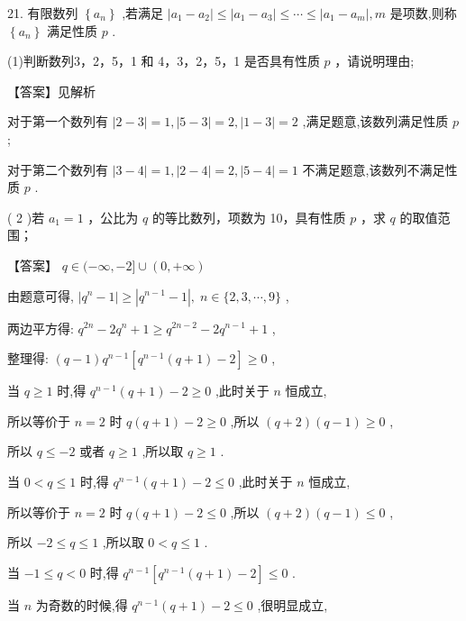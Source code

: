 \documentclass[10pt]{article}
\begin{document}
21. 有限数列 \(\left\{  {a}_{n}\right\}\) ,若满足 \(\left| {{a}_{1} - {a}_{2}}\right|  \leq  \left| {{a}_{1} - {a}_{3}}\right|  \leq  \cdots  \leq  \left| {{a}_{1} - {a}_{m}}\right| ,m\) 是项数,则称 \(\left\{  {a}_{n}\right\}\) 满足性质 \(p\) .

(1)判断数列3，2，5，1 和 4，3，2，5，1 是否具有性质 \(p\) ，请说明理由;

【答案】见解析

对于第一个数列有 \(\left| {2 - 3}\right|  = 1,\left| {5 - 3}\right|  = 2,\left| {1 - 3}\right|  = 2\) ,满足题意,该数列满足性质 \(p\) ;

对于第二个数列有 \(\left| {3 - 4}\right|  = 1,\left| {2 - 4}\right|  = 2,\left| {5 - 4}\right|  = 1\) 不满足题意,该数列不满足性质 \(p\) .

( 2 )若 \({a}_{1} = 1\) ，公比为 \(q\) 的等比数列，项数为 10，具有性质 \(p\) ，求 \(q\) 的取值范围；

【答案】 \(q \in  ( - \infty , - 2\rbrack  \cup  \left( {0, + \infty }\right)\)

由题意可得, \(\left| {{q}^{n} - 1}\right|  \geq  \left| {{q}^{n - 1} - 1}\right| ,\;n \in  \{ 2,3,\cdots ,9\}\) ,

两边平方得: \({q}^{2n} - 2{q}^{n} + 1 \geq  {q}^{{2n} - 2} - 2{q}^{n - 1} + 1\) ,

整理得: \(\left( {q - 1}\right) {q}^{n - 1}\left\lbrack  {{q}^{n - 1}\left( {q + 1}\right)  - 2}\right\rbrack   \geq  0\) ,

当 \(q \geq  1\) 时,得 \({q}^{n - 1}\left( {q + 1}\right)  - 2 \geq  0\) ,此时关于 \(n\) 恒成立,

所以等价于 \(n = 2\) 时 \(q\left( {q + 1}\right)  - 2 \geq  0\) ,所以 \(\left( {q + 2}\right) \left( {q - 1}\right)  \geq  0\) ,

所以 \(q \leq   - 2\) 或者 \(q \geq  1\) ,所以取 \(q \geq  1\) .

当 \(0 < q \leq  1\) 时,得 \({q}^{n - 1}\left( {q + 1}\right)  - 2 \leq  0\) ,此时关于 \(n\) 恒成立,

所以等价于 \(n = 2\) 时 \(q\left( {q + 1}\right)  - 2 \leq  0\) ,所以 \(\left( {q + 2}\right) \left( {q - 1}\right)  \leq  0\) ,

所以 \(- 2 \leq  q \leq  1\) ,所以取 \(0 < q \leq  1\) .

当 \(- 1 \leq  q < 0\) 时,得 \({q}^{n - 1}\left\lbrack  {{q}^{n - 1}\left( {q + 1}\right)  - 2}\right\rbrack   \leq  0\) .

当 \(n\) 为奇数的时候,得 \({q}^{n - 1}\left( {q + 1}\right)  - 2 \leq  0\) ,很明显成立,
\end{document}
